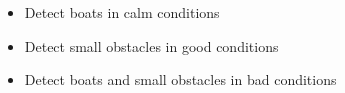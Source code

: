 \begin{itemize}
\item Detect boats in calm conditions
\item Detect small obstacles in good conditions
\item Detect boats and small obstacles in bad conditions
\end{itemize}
